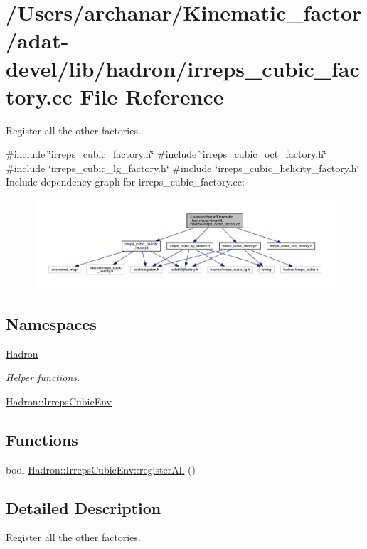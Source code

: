 \hypertarget{adat-devel_2lib_2hadron_2irreps__cubic__factory_8cc}{}\section{/\+Users/archanar/\+Kinematic\+\_\+factor/adat-\/devel/lib/hadron/irreps\+\_\+cubic\+\_\+factory.cc File Reference}
\label{adat-devel_2lib_2hadron_2irreps__cubic__factory_8cc}


Register all the other factories.  


{\ttfamily \#include \char`\"{}irreps\+\_\+cubic\+\_\+factory.\+h\char`\"{}}\newline
{\ttfamily \#include \char`\"{}irreps\+\_\+cubic\+\_\+oct\+\_\+factory.\+h\char`\"{}}\newline
{\ttfamily \#include \char`\"{}irreps\+\_\+cubic\+\_\+lg\+\_\+factory.\+h\char`\"{}}\newline
{\ttfamily \#include \char`\"{}irreps\+\_\+cubic\+\_\+helicity\+\_\+factory.\+h\char`\"{}}\newline
Include dependency graph for irreps\+\_\+cubic\+\_\+factory.\+cc\+:
\nopagebreak
\begin{figure}[H]
\begin{center}
\leavevmode
\includegraphics[width=350pt]{d8/df6/adat-devel_2lib_2hadron_2irreps__cubic__factory_8cc__incl}
\end{center}
\end{figure}
\subsection*{Namespaces}
\begin{DoxyCompactItemize}
\item 
 \mbox{\hyperlink{namespaceHadron}{Hadron}}
\begin{DoxyCompactList}\small\item\em Helper functions. \end{DoxyCompactList}\item 
 \mbox{\hyperlink{namespaceHadron_1_1IrrepsCubicEnv}{Hadron\+::\+Irreps\+Cubic\+Env}}
\end{DoxyCompactItemize}
\subsection*{Functions}
\begin{DoxyCompactItemize}
\item 
bool \mbox{\hyperlink{namespaceHadron_1_1IrrepsCubicEnv_a180ad30fa93d4d682cf36167092198ba}{Hadron\+::\+Irreps\+Cubic\+Env\+::register\+All}} ()
\end{DoxyCompactItemize}


\subsection{Detailed Description}
Register all the other factories. 

